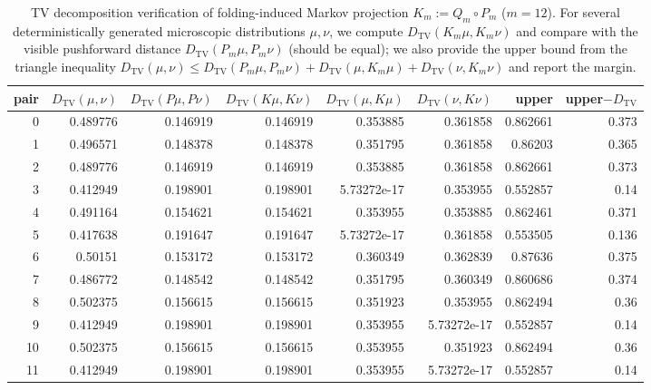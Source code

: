 \begin{table}[H]
\centering
\scriptsize
\setlength{\tabcolsep}{3pt}
\caption{TV decomposition verification of folding-induced Markov projection $K_m:=Q_m\circ P_m$ ($m=12$). For several deterministically generated microscopic distributions $\mu,\nu$, we compute $D_{\mathrm{TV}}(K_m\mu,K_m\nu)$ and compare with the visible pushforward distance $D_{\mathrm{TV}}(P_m\mu,P_m\nu)$ (should be equal); we also provide the upper bound from the triangle inequality $D_{\mathrm{TV}}(\mu,\nu)\le D_{\mathrm{TV}}(P_m\mu,P_m\nu)+D_{\mathrm{TV}}(\mu,K_m\mu)+D_{\mathrm{TV}}(\nu,K_m\nu)$ and report the margin.}
\label{tab:fold_markov_projection_tv_decomposition}
\begin{tabular}{rrrrrrrr}
\toprule
pair & $D_{\mathrm{TV}}(\mu,\nu)$ & $D_{\mathrm{TV}}(P\mu,P\nu)$ & $D_{\mathrm{TV}}(K\mu,K\nu)$ & $D_{\mathrm{TV}}(\mu,K\mu)$ & $D_{\mathrm{TV}}(\nu,K\nu)$ & upper & upper$-D_{\mathrm{TV}}$\\
\midrule
0 & 0.489776 & 0.146919 & 0.146919 & 0.353885 & 0.361858 & 0.862661 & 0.373\\
1 & 0.496571 & 0.148378 & 0.148378 & 0.351795 & 0.361858 & 0.86203 & 0.365\\
2 & 0.489776 & 0.146919 & 0.146919 & 0.353885 & 0.361858 & 0.862661 & 0.373\\
3 & 0.412949 & 0.198901 & 0.198901 & 5.73272e-17 & 0.353955 & 0.552857 & 0.14\\
4 & 0.491164 & 0.154621 & 0.154621 & 0.353955 & 0.353885 & 0.862461 & 0.371\\
5 & 0.417638 & 0.191647 & 0.191647 & 5.73272e-17 & 0.361858 & 0.553505 & 0.136\\
6 & 0.50151 & 0.153172 & 0.153172 & 0.360349 & 0.362839 & 0.87636 & 0.375\\
7 & 0.486772 & 0.148542 & 0.148542 & 0.351795 & 0.360349 & 0.860686 & 0.374\\
8 & 0.502375 & 0.156615 & 0.156615 & 0.351923 & 0.353955 & 0.862494 & 0.36\\
9 & 0.412949 & 0.198901 & 0.198901 & 0.353955 & 5.73272e-17 & 0.552857 & 0.14\\
10 & 0.502375 & 0.156615 & 0.156615 & 0.353955 & 0.351923 & 0.862494 & 0.36\\
11 & 0.412949 & 0.198901 & 0.198901 & 0.353955 & 5.73272e-17 & 0.552857 & 0.14\\
\bottomrule
\end{tabular}
\end{table}
